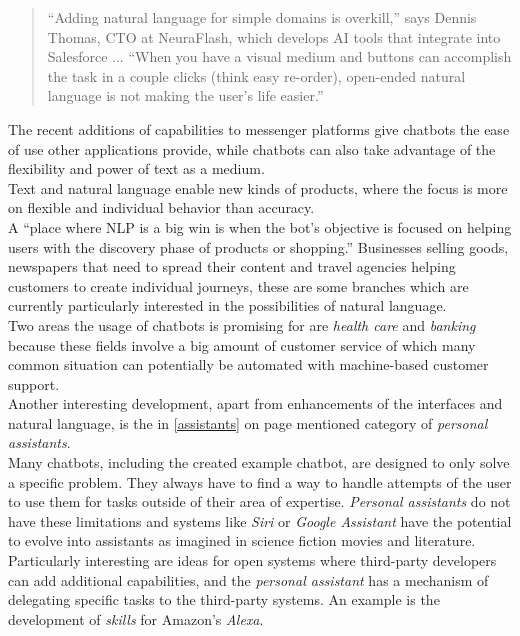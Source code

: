 \begin{quote}
“Adding natural language for simple domains is overkill,” says Dennis Thomas, CTO at NeuraFlash, which develops AI tools that integrate into Salesforce ... “When you have a visual medium and buttons can accomplish the task in a couple clicks (think easy re-order), open-ended natural language is not making the user’s life easier.”
\end{quote}

The recent additions of capabilities to messenger platforms give chatbots the ease of use other applications provide,
while chatbots can also take advantage of the flexibility and power of text as a medium.
\\

Text and natural language enable new kinds of products, where the focus is more on flexible and individual behavior than accuracy.
\\
A ``place where NLP is a big win is when the bot’s objective is focused on helping users with the discovery phase of products or shopping.''\cite{neednlp}
Businesses selling goods, newspapers that need to spread their content and travel agencies helping customers to create individual journeys,
these are some branches which are currently particularly interested in the possibilities of natural language.
\\
Two areas the usage of chatbots is promising for are \emph{health care} and \emph{banking}\cite{botlist}
because these fields involve a big amount of customer service of which many common situation can potentially be automated with machine-based customer support.
\\

Another interesting development, apart from enhancements of the interfaces and natural language, is the in \ref{assistants} on page \pageref{assistants} mentioned category of \emph{personal assistants}.
\\

Many chatbots, including the created example chatbot, are designed to only solve a specific problem.
They always have to find a way to handle attempts of the user to use them for tasks outside of their area of expertise.
\emph{Personal assistants} do not have these limitations
and systems like \emph{Siri} or \emph{Google Assistant} have the potential to evolve into assistants as imagined in science fiction movies and literature\cite{assistant}.
\\

Particularly interesting are ideas for open systems where third-party developers can add additional capabilities,
and the \emph{personal assistant} has a mechanism of delegating specific tasks to the third-party systems.
An example is the development of \emph{skills} for Amazon's \emph{Alexa}\cite{alexa}.
\\

